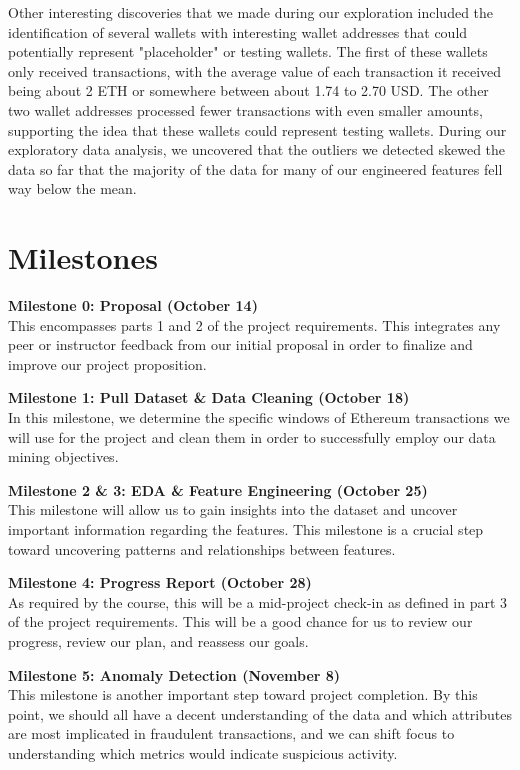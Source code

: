 \documentclass[sigconf]{acmart}
\begin{document}
Other interesting discoveries that we made during our exploration included the identification of several wallets with interesting wallet addresses that could potentially represent "placeholder" or testing wallets. The first of these wallets only received transactions, with the average value of each transaction it received being about 2 ETH or somewhere between about 1.74 to 2.70 USD. The other two wallet addresses processed fewer transactions with even smaller amounts, supporting the idea that these wallets could represent testing wallets. During our exploratory data analysis, we uncovered that the outliers we detected skewed the data so far that the majority of the data for many of our engineered features fell way below the mean. 

\section{Milestones}
\textbf{Milestone 0: Proposal (October 14)}\\
This encompasses parts 1 and 2 of the project requirements. This integrates any peer or instructor feedback from our initial proposal in order to finalize and improve our project proposition.

\textbf{Milestone 1: Pull Dataset \& Data Cleaning (October 18)}\\
In this milestone, we determine the specific windows of Ethereum transactions we will use for the project and clean them in order to successfully employ our data mining objectives.

\textbf{Milestone 2 \& 3: EDA \& Feature Engineering (October 25)}\\
This milestone will allow us to gain insights into the dataset and uncover important information regarding the features. This milestone is a crucial step toward uncovering patterns and relationships between features.

\textbf{Milestone 4: Progress Report (October 28)}\\
As required by the course, this will be a mid-project check-in as defined in part 3 of the project requirements. This will be a good chance for us to review our progress, review our plan, and reassess our goals.

\textbf{Milestone 5: Anomaly Detection (November 8)}\\
This milestone is another important step toward project completion. By this point, we should all have a decent understanding of the data and which attributes are most implicated in fraudulent transactions, and we can shift focus to understanding which metrics would indicate suspicious activity.
\end{document}
